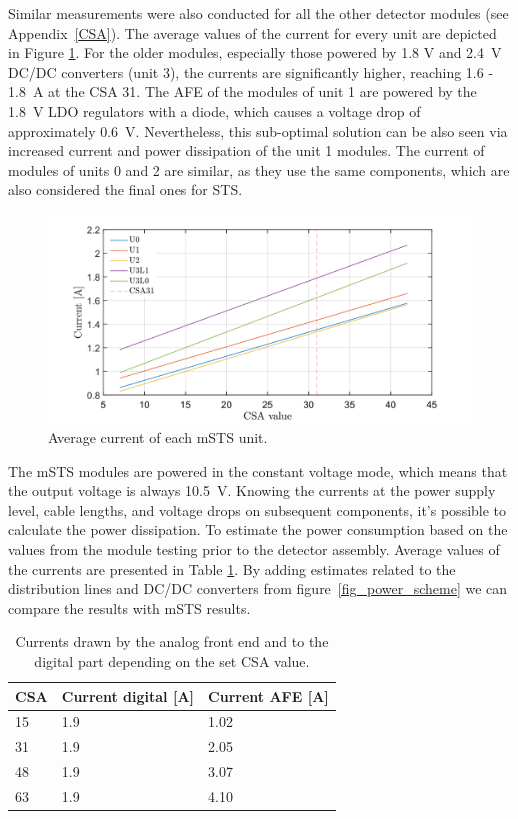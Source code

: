 Similar measurements were also conducted for all the other detector modules (see Appendix~\ref{CSA}). The average values of the current for every unit are depicted in Figure \ref{fig_avg}. For the older modules, especially those powered by 1.8 V and 2.4~V DC/DC converters (unit 3), the currents are significantly higher, reaching 1.6 - 1.8~A at the \gls{CSA} 31. The \gls{AFE} of the modules of unit 1 are powered by the 1.8~V \gls{LDO} regulators with a diode, which causes a voltage drop of approximately 0.6~V. Nevertheless, this sub-optimal solution can be also seen via increased current and power dissipation of the unit 1 modules. The current of modules of units 0 and 2 are similar, as they use the same components, which are also considered the final ones for \gls{STS}.

\begin{figure}[h!]
\centering
\includegraphics[width=0.9\columnwidth]{Chapter6/DCS/images/units.png}
\caption{Average current of each \gls{mSTS} unit.}
\label{fig_avg}
\end{figure}
\newpage
The \gls{mSTS} modules are powered in the constant voltage mode, which means that the output voltage is always 10.5~V. Knowing the currents at the power supply level, cable lengths, and voltage drops on subsequent components, it's possible to calculate the power dissipation. 
To estimate the power consumption based on the values from the module testing prior to the detector assembly. Average values of the currents are presented in Table \ref{tab:typical_cons}. By adding estimates related to the distribution lines and DC/DC converters from figure~\ref{fig_power_scheme} we can compare the results with \gls{mSTS} results. 
\begin{table}[!h]
\caption{Currents drawn by the analog front end and to the digital part depending on the set \gls{CSA} value.}
\centering
\begin{tabular}{lll}
\hline
CSA & Current digital {[}A{]} & Current \gls{AFE} {[}A{]} \\ \hline
15  & 1.9                 & 1.02                    \\
31  & 1.9                 & 2.05                    \\
48  & 1.9                 & 3.07                    \\
63  & 1.9                 & 4.10                    \\ \hline
\end{tabular}

\label{tab:typical_cons}
\end{table}

